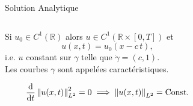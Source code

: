 \documentclass[aspectratio=169, french]{beamer}
\newcommand{\bbR}{\mathbb{R}}
\newcommand*{\norm}[1]{\ensuremath{\left\|#1\right\|}}
\begin{document}
\begin{frame}{Solution Analytique}
	\begin{columns}
	\begin{column}{.58\textwidth}
		\begin{overlayarea}{\textwidth}{\textheight}
		\vspace{.2cm}
		\begin{tcolorbox}[title = Solution analytique regulière, coltitle=white]
			Si $u_0 \in C^{1}(\bbR)$ alors  
			$u \in C^{1}(\bbR \times[0, T])$ et
			\begin{equation*}
				u(x, t) = 	u_0(x - c\, t),
			\end{equation*}
		i.e. $u$ constant sur $\gamma$ telle que $\dot{\gamma} = (c ,1)$. \\
		Les courbes $\gamma$ sont appelées caractéristiques.
		\end{tcolorbox}
		\vspace{.2cm}
		\begin{tcolorbox}[title = Conservation de l'energie, coltitle=white]
			\begin{equation*}
				\diff{}{t}\norm{u(x, t)}_{L^2}^2 = 0 \implies \norm{u(x, t)}_{L^2} = \mathrm{Const}.
			\end{equation*}
		\end{tcolorbox}
		\end{overlayarea}
	\end{column}
	\begin{column}{.42\textwidth}
		\begin{overlayarea}{\textwidth}{\textheight}
		\begin{figure}[t]
\end{figure}
\end{overlayarea}
\end{column}
\end{columns}
\end{frame}
\end{document}
